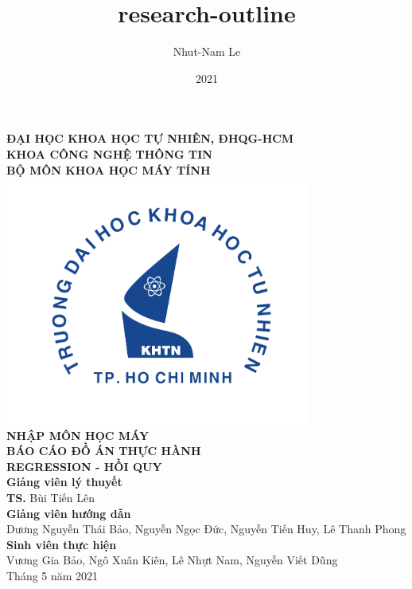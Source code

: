 \documentclass{article}
\title{research-outline}
\author{Nhut-Nam Le}
\date{2021}
\newcommand\B{\rule[-1.2ex]{0pt}{0pt}} %
\begin{document}
	\begin{titlepage}
		\begin{center}
			\large{\textbf{ĐẠI HỌC KHOA HỌC TỰ NHIÊN, ĐHQG-HCM\\KHOA CÔNG NGHỆ THÔNG TIN\\BỘ MÔN KHOA HỌC MÁY TÍNH}}\\
			\includegraphics[width=0.75\textwidth]{images/khtn.png}\\
			\large \textbf{NHẬP MÔN HỌC MÁY}\\[0.1in]
			\huge \textbf{BÁO CÁO ĐỒ ÁN THỰC HÀNH}\\[0.1in]
			\huge \textbf{REGRESSION - HỒI QUY}\\[0.1in]
			\vfill
			\normalsize
			\normalsize
			\textbf{Giảng viên lý thuyết}\\
			{\textbf{TS.} Bùi Tiến Lên}\\[0.1in]
			\textbf{Giảng viên hướng dẫn}\\
			\vspace{0.1in}
			{Dương Nguyễn Thái Bảo, Nguyễn Ngọc Đức, Nguyễn Tiến Huy, Lê Thanh Phong}\\[0.1in]
			\textbf{Sinh viên thực hiện} \\
			\vspace{0.1in}
			{Vương Gia Bảo, Ngô Xuân Kiên, Lê Nhựt Nam, Nguyễn Viết Dũng}\\[0.1in]
			\vfill
			Tháng 5 năm 2021
		\end{center}
	\end{titlepage}
	\newpage
	
	\cleardoublepage
\end{document}

